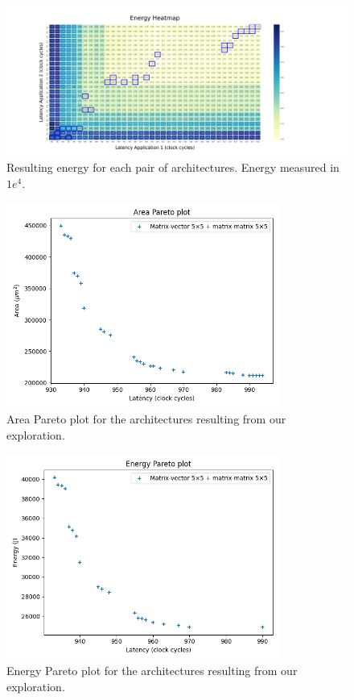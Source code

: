 \begin{figure}[!htb]
    \centering
    \hspace*{-1.75cm}\includegraphics[width=1.4\textwidth]{graphs/plot_heatmap_energy.png}
    \caption{Resulting energy for each pair of architectures. Energy measured in $1e^4$.}
    \label{fig:plot_heatmap_energy}
\end{figure}

\begin{figure}[!htb]
    \centering
    \hspace*{-1.2cm}\includegraphics[width=0.8\textwidth]{graphs/plot_pareto_latency_area.png}
    \caption{Area Pareto plot for the architectures resulting from our exploration.}
    \label{fig:plot_pareto_latency_area}
\end{figure}

\begin{figure}[!htb]
    \centering
    \hspace*{-1.2cm}\includegraphics[width=0.8\textwidth]{graphs/plot_pareto_latency_energy.png}
    \caption{Energy Pareto plot for the architectures resulting from our exploration.}
    \label{fig:plot_pareto_latency_energy}
\end{figure}

